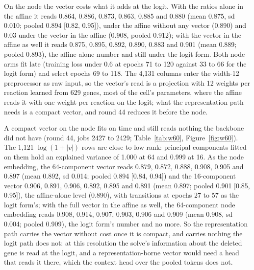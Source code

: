 On the node the vector costs what it adds at the logit. With the ratios alone in the
affine it reads 0.864, 0.886, 0.873, 0.863, 0.885 and 0.880 (mean 0.875, sd 0.010;
pooled 0.894 [0.82, 0.95]), under the affine without any vector (0.890) and 0.03
under the vector in the affine (0.908, pooled 0.912); with the vector in the affine as
well it reads 0.875, 0.895, 0.892, 0.890, 0.883 and 0.901 (mean 0.889; pooled 0.893),
the affine-alone number and still under the logit form. Both node arms fit late
(training loss under 0.6 at epochs 71 to 120 against 33 to 66 for the logit form) and
select epochs 69 to 118. The 4,131 columns enter the width-12 preprocessor as raw
input, so the vector's read is a projection with 12 weights per reaction learned
from 629 genes, most of the cell's parameters, where the affine reads it with one
weight per reaction on the logit; what the representation path needs is a compact
vector, and round 44 reduces it before the node.

A compact vector on the node fits on time and still reads nothing the backbone did
not have (round 44, jobs 2427 to 2429; Table~\ref{tab:w60}, Figure~\ref{fig:w60}).
The 1,121 $\log(1 + |v|)$ rows are close to low rank: principal components fitted on
them hold an explained variance of 1.000 at 64 and 0.999 at 16. As the node
embedding, the 64-component vector reads 0.879, 0.872, 0.888, 0.908, 0.905 and 0.897
(mean 0.892, sd 0.014; pooled 0.894 [0.84, 0.94]) and the 16-component vector 0.906,
0.891, 0.906, 0.892, 0.895 and 0.891 (mean 0.897; pooled 0.901 [0.85, 0.95]), the
affine-alone level (0.890), with transitions at epochs 27 to 57 as the logit form's;
with the full vector in the affine as well, the 64-component node embedding reads
0.908, 0.914, 0.907, 0.903, 0.906 and 0.909 (mean 0.908, sd 0.004; pooled 0.909),
the logit form's number and no more. So the representation path carries the vector
without cost once it is compact, and carries nothing the logit path does not: at this
resolution the solve's information about the deleted gene is read at the logit, and
a representation-borne vector would need a head that reads it there, which the
context head over the pooled tokens does not.




